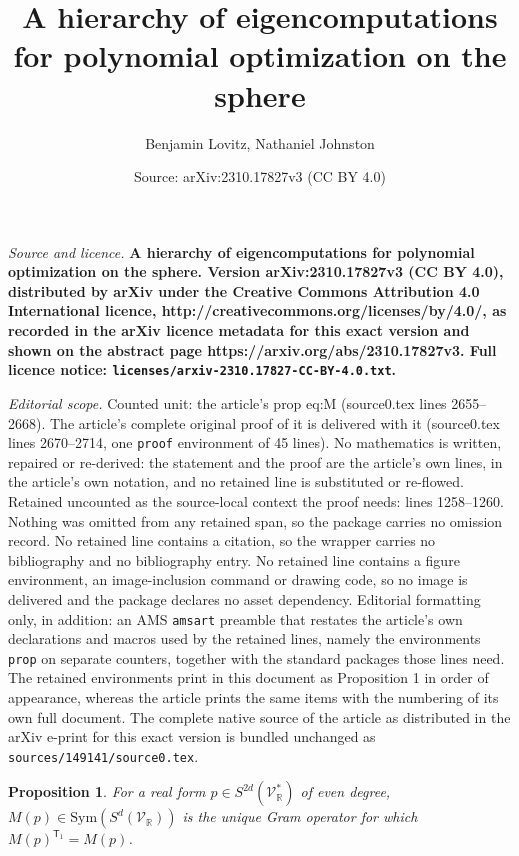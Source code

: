 \documentclass[10pt,a4paper]{amsart}
\title{\bf A hierarchy of eigencomputations for polynomial optimization on the sphere}
\author{Benjamin Lovitz, Nathaniel Johnston}
\date{Source: arXiv:2310.17827v3 (CC BY 4.0)}
\newtheorem{prop}{Proposition}
\newcommand{\Sym}{\setft{Sym}}
\newcommand\V{\mathcal{V}}
\newcommand{\Vr}{\V_{\real}}
\newcommand{\real}{\mathbb{R}}
\newcommand{\setft}[1]{\mathrm{#1}}
\renewcommand{\t}{{\scriptscriptstyle\mathsf{T}}}
\begin{document}
\maketitle

\noindent\emph{Source and licence.} \bf A hierarchy of eigencomputations for polynomial optimization on the sphere. Version arXiv:2310.17827v3 (CC BY 4.0), distributed by arXiv under the Creative Commons Attribution 4.0 International licence, http://creativecommons.org/licenses/by/4.0/, as recorded in the arXiv licence metadata for this exact version and shown on the abstract page https://arxiv.org/abs/2310.17827v3. Full licence notice: \texttt{licenses/arxiv-2310.17827-CC-BY-4.0.txt}.\par\smallskip

\noindent\textit{Editorial scope.} Counted unit: the article's prop eq:M (source0.tex lines 2655--2668). The article's complete original proof of it is delivered with it (source0.tex lines 2670--2714, one \texttt{proof} environment of 45 lines). No mathematics is written, repaired or re-derived: the statement and the proof are the article's own lines, in the article's own notation, and no retained line is substituted or re-flowed.  Retained uncounted as the source-local context the proof needs: lines 1258--1260.  Nothing was omitted from any retained span, so the package carries no omission record.  No retained line contains a citation, so the wrapper carries no bibliography and no bibliography entry.  No retained line contains a figure environment, an image-inclusion command or drawing code, so no image is delivered and the package declares no asset dependency.  Editorial formatting only, in addition: an AMS \texttt{amsart} preamble that restates the article's own declarations and macros used by the retained lines, namely the environments \texttt{prop} on separate counters, together with the standard packages those lines need.  The retained environments print in this document as Proposition 1 in order of appearance, whereas the article prints the same items with the numbering of its own full document.  The complete native source of the article as distributed in the arXiv e-print for this exact version is bundled unchanged as \texttt{sources/149141/source0.tex}.
\begin{prop}\label{prop:sym}
For a real form $p \in S^{2d}(\Vr^*)$ of even degree, $M(p) \in \Sym(S^{d}(\Vr))$ is the unique Gram operator for which $M(p)^{\t_1}=M(p)$.
\end{prop}
\end{document}
